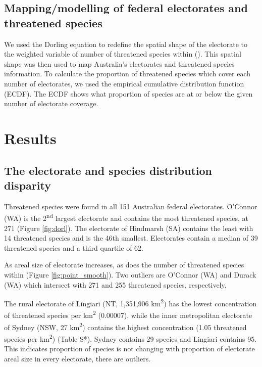 \documentclass[a4paper,11pt]{article}
\begin{document}
\subsection{Mapping/modelling of federal electorates and threatened species}

We used the Dorling equation to redefine the spatial shape of the electorate to the weighted variable of number of threatened species within (\cite{hahnTmapMakingMaps,jeworutzkiCartogramCreateCartograms2020}). This spatial shape was then used to map Australia's electorates and threatened species information. To calculate the proportion of threatened species which cover each number of electorates, we used the empirical cumulative distribution function (ECDF). The ECDF shows what proportion of species are at or below the given number of electorate coverage.

\section{Results}

\subsection{The electorate and species distribution disparity}

Threatened species were found in all 151 Australian federal electorates. O'Connor (WA) is the 2\textsuperscript{nd} largest electorate and contains the most threatened species, at 271 (Figure \ref{fig:dorl}). The electorate of Hindmarsh (SA) contains the least with 14 threatened species and is the 46th smallest. Electorates contain a median of 39 threatened species and a third quartile of 62.

As areal size of electorate increases, as does the number of threatened species within (Figure \ref{fig:point_smooth}). Two outliers are O'Connor (WA) and Durack (WA) which intersect with 271 and 255 threatened species, respectively.

The rural electorate of Lingiari (NT, 1,351,906 km\textsuperscript{2}) has the lowest concentration of threatened species per km\textsuperscript{2} (0.00007), while the inner metropolitan electorate of Sydney (NSW, 27 km\textsuperscript{2}) contains the highest concentration (1.05 threatened species per km\textsuperscript{2}) (Table S*). Sydney contains 29 species and Lingiari contains 95. This indicates proportion of species is not changing with proportion of electorate areal size in every electorate, there are outliers.
\end{document}
